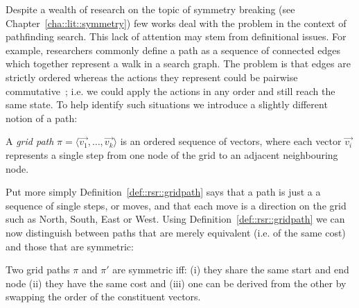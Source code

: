Despite a wealth of research on the topic of symmetry breaking (see
Chapter~\ref{cha::lit::symmetry}) few works deal with the problem in the
context of pathfinding search.  This lack of attention may stem from
definitional issues. For example, researchers commonly define a path as a
sequence of connected edges which together represent a walk in a search graph.
The problem is that edges are strictly ordered whereas the actions they
represent could be pairwise commutative~\citep{haslum00}; i.e. we could apply
the actions in any order and still reach the same state.  To help identify
such situations we introduce a slightly different notion of a path:

\begin{definition}
\label{def::rsr::gridpath}
A \emph{grid path} $\pi = \langle \vec{v_1}, \ldots, \vec{v_k} \rangle$ is an ordered sequence 
of vectors, where each vector $\vec{v_i}$ represents a single step from one node of 
the grid to an adjacent neighbouring node. 
\end{definition}

Put more simply Definition~\ref{def::rsr::gridpath} says that a path is just a
a sequence of single steps, or moves, and that each move is a direction on the 
grid such as North, South, East or West. Using
Definition~\ref{def::rsr::gridpath} we can now distinguish between paths that
are merely equivalent (i.e. of the same cost) and those that are symmetric:

\begin{definition}
Two grid paths $\pi$ and $\pi'$ are symmetric iff: (i) they share the same 
start and end node (ii) they have the same cost and (iii) one can be derived from 
the other by swapping the order of the constituent vectors.
\end{definition}


